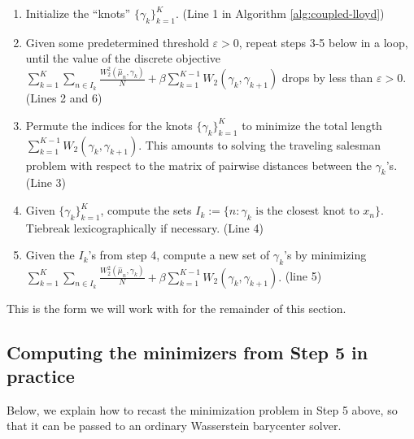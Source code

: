 \documentclass[aos, preprint]{imsart}
\theoremstyle{plain}
\theoremstyle{remark}
\begin{document}
\begin{appendix}
\begin{enumerate}
    \item Initialize the ``knots'' $\{\gamma_{k}\}_{k=1}^{K}$. (Line 1 in Algorithm \ref{alg:coupled-lloyd})
    \item Given some predetermined threshold $\varepsilon>0$, repeat steps 3-5 below in a loop, until the value of the discrete objective $\sum_{k=1}^{K}\sum_{n\in
      I_{k}}\frac{W_2^{2}(\hat{\mu}_{n},\gamma_{k})}{N}+\beta\sum_{k=1}^{K-1}W_2(\gamma_{k},\gamma_{k+1})$ drops by less than
     $\varepsilon>0$. (Lines 2 and 6)
    \item Permute the indices for the knots $\{\gamma_{k}\}_{k=1}^{K}$ to
    minimize the total length $\sum_{k=1}^{K-1}W_2(\gamma_{k},\gamma_{k+1})$. This amounts to solving the traveling salesman problem with respect to the matrix of pairwise distances between the $\gamma_k$'s. (Line 3)
    \item Given $\{\gamma_{k}\}_{k=1}^{K}$, compute the sets $I_{k}:=\{n:\gamma_{k}\text{ is the closest knot to }x_{n}\}$.
    Tiebreak lexicographically if necessary. (Line 4)
    \item Given the $I_{k}$'s from step 4, compute a new set of $\gamma_{k}$'s
    by minimizing
    $\sum_{k=1}^{K}\sum_{n\in I_{k}}\frac{W_2^{2}(\hat{\mu}_{n},\gamma_{k})}{N}+\beta\sum_{k=1}^{K-1}W_2(\gamma_{k},\gamma_{k+1}).$ (line 5)
\end{enumerate}
This is the form we will work with for the remainder of this section.

\subsection*{Computing the minimizers from Step 5 in practice}
Below, we explain how to recast the minimization problem in Step 5 above, so that it can be passed to an ordinary Wasserstein barycenter solver.


\end{appendix}
\end{document}
